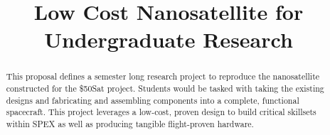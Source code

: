 \documentclass[conference]{IEEEtran} %
\title{Low Cost Nanosatellite for Undergraduate Research}
\author{
  \IEEEauthorblockN{%
    T.J.~Tarazevits\IEEEauthorrefmark{1},
  }
  \IEEEauthorblockA{%
    RIT Space Exploration, Rochester Institute of Technology \\ %
    Rochester, N.Y. \\
    Email:
    \IEEEauthorrefmark{1}tjt3085@rit.edu,
  }

}
\begin{document}
\maketitle%

\begin{abstract}
This proposal defines a semester long research project to reproduce the nanosatellite constructed for the \$50Sat project.
Students would be tasked with taking the existing designs and fabricating and assembling components into a complete, functional spacecraft.
This project leverages a low-cost, proven design to build critical skillsets within SPEX as well as producing tangible flight-proven hardware.

\end{abstract}

\label{sec:nomenclature}
\newcommand{\nomunit}[1]{%
\renewcommand{\nomentryend}{\hspace*{\fill}#1}}
\renewcommand{\nompreamble}{

  }
\printnomenclature{}
\end{document}
